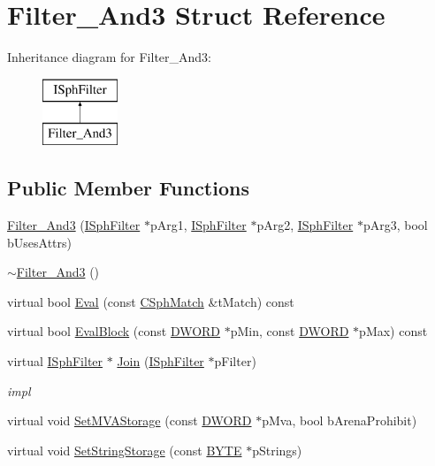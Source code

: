 \hypertarget{structFilter__And3}{\section{Filter\-\_\-\-And3 Struct Reference}
\label{structFilter__And3}
}
Inheritance diagram for Filter\-\_\-\-And3\-:\begin{figure}[H]
\begin{center}
\leavevmode
\includegraphics[height=2.000000cm]{structFilter__And3}
\end{center}
\end{figure}
\subsection*{Public Member Functions}
\begin{DoxyCompactItemize}
\item 
\hyperlink{structFilter__And3_ab35edbedad8e4b306b0db302baea72b1}{Filter\-\_\-\-And3} (\hyperlink{structISphFilter}{I\-Sph\-Filter} $\ast$p\-Arg1, \hyperlink{structISphFilter}{I\-Sph\-Filter} $\ast$p\-Arg2, \hyperlink{structISphFilter}{I\-Sph\-Filter} $\ast$p\-Arg3, bool b\-Uses\-Attrs)
\item 
\hyperlink{structFilter__And3_af2744aa9bff73857bc9b6224a7e207ff}{$\sim$\-Filter\-\_\-\-And3} ()
\item 
virtual bool \hyperlink{structFilter__And3_a3f78e0a365e382e835680f933380b886}{Eval} (const \hyperlink{classCSphMatch}{C\-Sph\-Match} \&t\-Match) const 
\item 
virtual bool \hyperlink{structFilter__And3_a684a9358bf31e4559504d9cf7c6d295e}{Eval\-Block} (const \hyperlink{sphinxstd_8h_a798af1e30bc65f319c1a246cecf59e39}{D\-W\-O\-R\-D} $\ast$p\-Min, const \hyperlink{sphinxstd_8h_a798af1e30bc65f319c1a246cecf59e39}{D\-W\-O\-R\-D} $\ast$p\-Max) const 
\item 
virtual \hyperlink{structISphFilter}{I\-Sph\-Filter} $\ast$ \hyperlink{structFilter__And3_a613b454b06eaa49e21a51fe42e49880e}{Join} (\hyperlink{structISphFilter}{I\-Sph\-Filter} $\ast$p\-Filter)
\begin{DoxyCompactList}\small\item\em impl \end{DoxyCompactList}\item 
virtual void \hyperlink{structFilter__And3_a7acf0b2c50aea4737e629365263a00e0}{Set\-M\-V\-A\-Storage} (const \hyperlink{sphinxstd_8h_a798af1e30bc65f319c1a246cecf59e39}{D\-W\-O\-R\-D} $\ast$p\-Mva, bool b\-Arena\-Prohibit)
\item 
virtual void \hyperlink{structFilter__And3_a792ce6418e595fa55c0e0e4277c98cf2}{Set\-String\-Storage} (const \hyperlink{sphinxstd_8h_a4ae1dab0fb4b072a66584546209e7d58}{B\-Y\-T\-E} $\ast$p\-Strings)
\end{DoxyCompactItemize}
